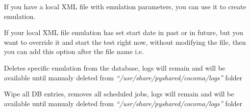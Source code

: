 \documentclass[letterpaper,10pt,english]{sphinxmanual}
\begin{document}

\begin{fulllineitems}
\label{01_how_to_use_it:cmdoption-ccmsh-x}
If you have a local XML file with emulation parameters, you can use it to create emulation.

\end{fulllineitems}


\begin{fulllineitems}
\label{01_how_to_use_it:cmdoption-ccmsh-n}
If your local XML file emulation has set start date in past or in future, but you want to override it and start the test right now, without modifying the file, then you can add this option after the file name i.e. 

\end{fulllineitems}


\begin{fulllineitems}
\label{01_how_to_use_it:cmdoption-ccmsh-d}
Deletes specific emulation from the database, logs will remain and will be available until manualy deleted from \emph{``/usr/share/pyshared/cocoma/logs''} folder

\end{fulllineitems}


\begin{fulllineitems}
\label{01_how_to_use_it:cmdoption-ccmsh-p}
Wipe all DB entries, removes all scheduled jobs, logs will remain and will be available until manualy deleted from \emph{``/usr/share/pyshared/cocoma/logs''} folder

\end{fulllineitems}
\end{document}
